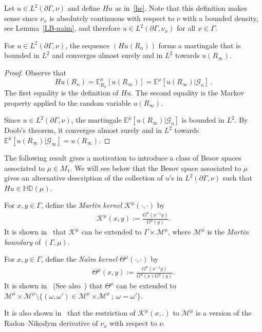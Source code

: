 \documentclass[AHL,Unicode,longabstracts,published]{cedram}
\newcommand{\cm}{\mathcal{M}}
\newcommand{\ck}{\mathcal{K}}
\newcommand{\cG}{\mathcal{G}}
\newcommand{\be}{\mathbb{E}}
\newcommand{\bHD}{\mathbb{HD}}
\begin{document}
Let $u\in L^2(\partial\Gamma,\nu)$ and define $Hu$ as in~\eqref{he}. Note that this definition makes sense since $\nu_x$ is absolutely continuous with respect to $\nu$ with a bounded density, see Lemma~\ref{LB-naim}, and therefore $u\in L^2(\partial\Gamma,\nu_x)$ for all $x\in\Gamma$.

\begin{lemm}\label{harm-ext}
For $u\in L^2(\partial\Gamma,\nu)$, the sequence $(Hu(R_n))$ forms a martingale that is bounded in $L^2$ and converges almost surely and in $L^2$ towards $u(R_\infty)$.
\end{lemm}
\begin{proof}
Observe that
\begin{equation}\label{eq:he}
Hu(R_n)=\be^\mu_{R_n}[u(R_\infty)]=\be^\mu[u(R_\infty)\vert\cG_n]\,.
\end{equation}
The first equality is the definition of $Hu$. The second equality is the Markov property applied to the random variable $u(R_\infty)$.

Since $u\in L^2(\partial\Gamma,\nu)$, the martingale $\be^\mu[u(R_\infty)\vert\cG_n]$ is bounded in $L^2$. By Doob's theorem, it converges almost surely and in $L^2$ towards $\be^\mu[u(R_\infty)\vert\cG_\infty]=u(R_\infty)$.
\end{proof}



The following result gives a motivation to introduce a class of Besov spaces associated to $\mu\in M_1$. We will see below that the Besov space associated to $\mu$ gives an alternative description of the collection of $u$'s in $L^2(\partial\Gamma,\nu)$ such that $Hu\in\bHD(\mu)$.

\begin{defi}\label{naim kernel}
For $x,y\in\Gamma$, define the \emph{Martin kernel} $\ck^{\mu}(\cdot,\cdot)$ by
\begin{align*}
\ck^{\mu}(x,y):=\frac{G^{\mu}\left(x^{-1}y\right)}{G^{\mu}(y)}.
\end{align*}
It is shown in~\cite{Dyn} that $ \ck^{\mu}$ can be extended to $\Gamma\times\cm^{\mu}$, where $\cm^{\mu}$ is the \emph{Martin boundary} of $(\Gamma,\mu)$.

For $x,y\in\Gamma$, define the \emph{Na{\"\i}m kernel} $\Theta^{\mu}(\cdot,\cdot)$ by
\begin{align*}
\Theta^{\mu}(x,y):=\frac{G^{\mu}\left(x^{-1}y\right)}{G^{\mu}(x)G^{\mu}(y)}.
\end{align*}
It is shown in~\cite{Sil} (See also~\cite{Na}) that $\Theta^{\mu}$ can be extended to $\cm^{\mu}\times\cm^{\mu}
\setminus\{(\omega,\omega')\in\cm^{\mu}\times\cm^{\mu}\ ;\ \omega=\omega'\}$.

It is also shown in~\cite{Dyn} that the restriction of $\ck^\mu(x,.)$ to $\cm^{\mu}$ is a version of the Radon--Nikodym derivative of $\nu_x$ with respect to $\nu$.
\end{defi}
\end{document}

